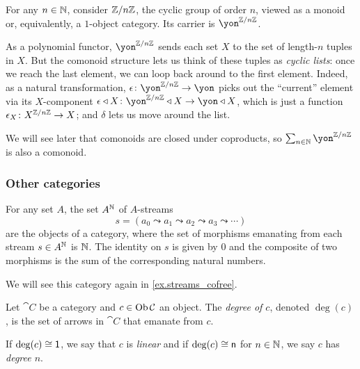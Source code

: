 \documentclass[Book-Poly]{subfiles}
\begin{document}
\begin{example}
For any $n\in\mathbb{N}$, consider $\mathbb{Z}/n\mathbb{Z}$, the cyclic group of order $n$, viewed as a monoid or, equivalently, a $1$-object category.
Its carrier is $\yon^{\zz/n\zz}$.

As a polynomial functor, $\yon^{\zz/n\zz}$ sends each set $X$ to the set of length-$n$ tuples in $X$.
But the comonoid structure lets us think of these tuples as \emph{cyclic lists}: once we reach the last element, we can loop back around to the first element.
Indeed, as a natural transformation, $\epsilon\colon\yon^{\zz/n\zz}\to\yon$ picks out the ``current'' element via its $X$-component $\epsilon\tri X\colon\yon^{\zz/n\zz}\tri X\to\yon\tri X$, which is just a function $\epsilon_X\colon X^{\mathbb{Z}/n\mathbb{Z}}\to X$; and $\delta$ lets us move around the list.%

We will see later that comonoids are closed under coproducts, so $\sum_{n\in\nn}\yon^{\zz/n\zz}$ is also a comonoid.
\end{example}



\subsubsection{Other categories}

\begin{example}\label{ex.streams_category}
For any set $A$, the set $A^{\mathbb{N}}$ of $A$-streams
\[
s=(a_0\leadsto a_1\leadsto a_2\leadsto a_3\leadsto\cdots)
\]
are the objects of a category, where the set of morphisms emanating from each stream $s\in A^{\mathbb{N}}$ is $\mathbb{N}$. The identity on $s$ is given by $0$ and the composite of two morphisms is the sum of the corresponding natural numbers.

We will see this category again in \cref{ex.streams_cofree}.
\end{example}





\begin{definition}
Let $\cat{C}$ be a category and $c\in\operatorname{Ob}\mathcal{C}$ an object. The \emph{degree of $c$}, denoted $\deg(c)$, is the set of arrows in $\cat{C}$ that emanate from $c$.

If $\deg(c)\cong \textsf{1}$, we say that $c$ is \emph{linear} and if $\deg(c)\cong\mathsf{n}$ for $n\in\mathbb{N}$, we say $c$ has \emph{degree $n$}.
\end{definition}
\end{document}

